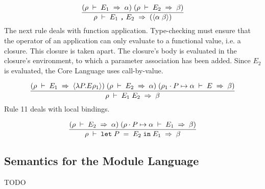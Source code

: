 \documentclass[10pt]{article}
\begin{document}
\begin{equation}
\frac{{\mathrm\mathbf{}(}\rho{}\;\vdash{}\;E_{1}\;\Rightarrow{}\;\alpha{}{\mathrm\mathbf{})}\;{\mathrm\mathbf{}(}\rho{}\;\vdash{}\;E_{2}\;\Rightarrow{}\;\beta{}{\mathrm\mathbf{})}}%
{\rho{}\;\vdash{}\;E_{1}\;\texttt{,}\;E_{2}\;\Rightarrow{}\;{\mathrm\mathbf{}(}\langle{}\alpha{}\;\beta{}\rangle{}{\mathrm\mathbf{})}}\end{equation}
The next rule deals with function application. Type-checking must
ensure that the operator of an application can only evaluate to a
functional value, i.e. a closure. This closure is taken apart. The
closure's body is evaluated in the closure's environment, to which a
parameter association has been added. Since $E_{2}$ is
evaluated, the Core Language uses call-by-value. 

\begin{equation}
\frac{{\mathrm\mathbf{}(}\rho{}\;\vdash{}\;E_{1}\;\Rightarrow{}\;\langle{}\lambda{}P.E\rho{}_{1}\rangle{}{\mathrm\mathbf{})}\;{\mathrm\mathbf{}(}\rho{}\;\vdash{}\;E_{2}\;\Rightarrow{}\;\alpha{}{\mathrm\mathbf{})}\;{\mathrm\mathbf{}(}\rho{}_{1}\cdot{}P\mapsto{}\alpha{}\;\vdash{}\;E\;\Rightarrow{}\;\beta{}{\mathrm\mathbf{})}}%
{\rho{}\;\vdash{}\;E_{1}\;E_{2}\;\Rightarrow{}\;\beta{}}\end{equation}
Rule 11 deals with local bindings. 

\begin{equation}
\frac{{\mathrm\mathbf{}(}\rho{}\;\vdash{}\;E_{2}\;\Rightarrow{}\;\alpha{}{\mathrm\mathbf{})}\;{\mathrm\mathbf{}(}\rho{}\cdot{}P\mapsto{}\alpha{}\;\vdash{}\;E_{1}\;\Rightarrow{}\;\beta{}{\mathrm\mathbf{})}}%
{\rho{}\;\vdash{}\;\texttt{let}\;P\;=\;E_{2}\;\texttt{in}\;E_{1}\;\Rightarrow{}\;\beta{}}\end{equation}
\subsection*{Semantics for the Module Language}
TODO
\end{document}
